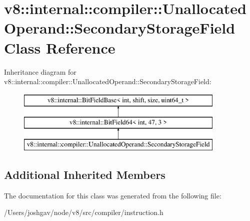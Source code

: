 \hypertarget{classv8_1_1internal_1_1compiler_1_1_unallocated_operand_1_1_secondary_storage_field}{}\section{v8\+:\+:internal\+:\+:compiler\+:\+:Unallocated\+Operand\+:\+:Secondary\+Storage\+Field Class Reference}
\label{classv8_1_1internal_1_1compiler_1_1_unallocated_operand_1_1_secondary_storage_field}
Inheritance diagram for v8\+:\+:internal\+:\+:compiler\+:\+:Unallocated\+Operand\+:\+:Secondary\+Storage\+Field\+:\begin{figure}[H]
\begin{center}
\leavevmode
\includegraphics[height=3.000000cm]{classv8_1_1internal_1_1compiler_1_1_unallocated_operand_1_1_secondary_storage_field}
\end{center}
\end{figure}
\subsection*{Additional Inherited Members}


The documentation for this class was generated from the following file\+:\begin{DoxyCompactItemize}
\item 
/\+Users/joshgav/node/v8/src/compiler/instruction.\+h\end{DoxyCompactItemize}
